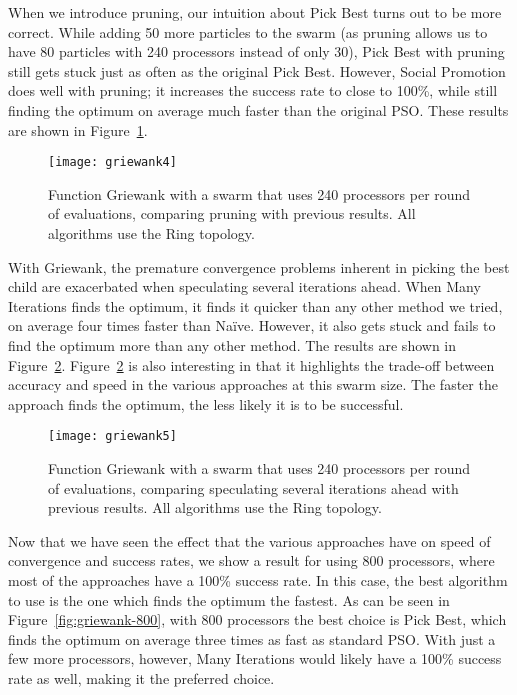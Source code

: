 \documentclass[smallcondensed]{svjour3}
\newcommand{\fig}[1]{Figure~\ref{fig:#1}}
\begin{document}
When we introduce pruning, our intuition about Pick Best turns out to be more
correct.  While adding 50 more particles to the swarm (as pruning allows us to
have 80 particles with 240 processors instead of only 30), Pick Best with
pruning still gets stuck just as often as the original Pick Best.  However,
Social Promotion does well with pruning; it increases the success rate to close
to 100\%, while still finding the optimum on average much faster than the
original PSO.  These results are shown in \fig{griewank-pruned}.

\begin{figure}
  \centering
  \texttt{[image: griewank4]}
  \caption{Function Griewank with a swarm that uses 240 processors per round of
  evaluations, comparing pruning with previous results.  All algorithms use the
  Ring topology.}
  \label{fig:griewank-pruned}
\end{figure}

With Griewank, the premature convergence problems inherent in picking the best
child are exacerbated when speculating several iterations ahead.  When Many
Iterations finds the optimum, it finds it quicker than any other method we
tried, on average four times faster than Na\"ive.  However, it also gets stuck
and fails to find the optimum more than any other method.  The results are
shown in \fig{griewank-manyiters}.   \fig{griewank-manyiters} is also
interesting in that it highlights the trade-off between accuracy and speed in
the various approaches at this swarm size.  The faster the approach finds the
optimum, the less likely it is to be successful.

\begin{figure}
  \centering
  \texttt{[image: griewank5]}
  \caption{Function Griewank with a swarm that uses 240 processors per round of
  evaluations, comparing speculating several iterations ahead with previous
  results.  All algorithms use the Ring topology.}
  \label{fig:griewank-manyiters}
\end{figure}

Now that we have seen the effect that the various approaches have on speed of
convergence and success rates, we show a result for using 800 processors, where
most of the approaches have a 100\% success rate.  In this case, the best
algorithm to use is the one which finds the optimum the fastest.  As can be
seen in \fig{griewank-800}, with 800 processors the best choice is Pick Best,
which finds the optimum on average three times as fast as standard PSO.  With
just a few more processors, however, Many Iterations would likely have a 100\%
success rate as well, making it the preferred choice.
\end{document}
